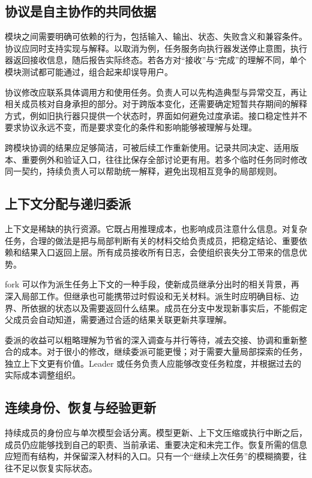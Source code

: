 \subsection{协议是自主协作的共同依据}
模块之间需要明确可依赖的行为，包括输入、输出、状态、失败含义和兼容条件。协议应同时支持实现与解释。以取消为例，任务服务向执行器发送停止意图，执行器返回接收信息，随后报告实际终态。若各方对“接收”与“完成”的理解不同，单个模块测试都可能通过，组合起来却误导用户。

协议修改应联系具体调用方和使用任务。负责人可以先构造典型与异常交互，再让相关成员核对自身承担的部分。对于跨版本变化，还需要确定短暂共存期间的解释方式，例如旧执行器只提供一个状态时，界面如何避免过度承诺。接口稳定性并不要求协议永远不变，而是要求变化的条件和影响能够被理解与处理。

跨模块协调的结果应足够简洁，可被后续工作重新使用。记录共同决定、适用版本、重要例外和验证入口，往往比保存全部讨论更有用。若多个临时任务同时修改同一契约，持续负责人可以帮助统一解释，避免出现相互竞争的局部规则。

\subsection{上下文分配与递归委派}
上下文是稀缺的执行资源。它既占用推理成本，也影响成员注意什么信息。对复杂任务，合理的做法是把与局部判断有关的材料交给负责成员，把稳定结论、重要依赖和结果入口返回上层。所有成员接收所有日志，会使组织丧失分工带来的信息优势。

fork 可以作为派生任务上下文的一种手段，使新成员继承分出时的相关背景，再深入局部工作。但继承也可能携带过时假设和无关材料。派生时应明确目标、边界、所依据的状态以及需要返回什么结果。成员在分支中发现新事实后，不能假定父成员会自动知道，需要通过合适的结果关联更新共享理解。

委派的收益可以粗略理解为节省的深入调查与并行等待，减去交接、协调和重新整合的成本。对于很小的修改，继续委派可能更慢；对于需要大量局部探索的任务，独立上下文更有价值。Leader 或任务负责人应能够改变任务粒度，并根据过去的实际成本调整组织。


\subsection{连续身份、恢复与经验更新}
持续成员的身份应与单次模型会话分离。模型更新、上下文压缩或执行中断之后，成员仍应能够找到自己的职责、当前承诺、重要决定和未完工作。恢复所需的信息应短而有结构，并保留深入材料的入口。只有一个“继续上次任务”的模糊摘要，往往不足以恢复实际状态。

